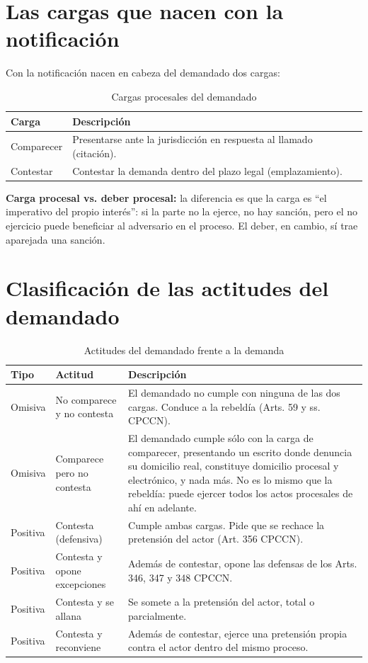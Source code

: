 \documentclass[12pt,oneside]{book}
\begin{document}
\section{Las cargas que nacen con la notificación}

Con la notificación nacen en cabeza del demandado dos cargas:

\begin{table}[H]
\centering
\caption{Cargas procesales del demandado}
\begin{tabularx}{\textwidth}{l X}
\toprule
\textbf{Carga} & \textbf{Descripción} \\
\midrule
Comparecer & Presentarse ante la jurisdicción en respuesta al llamado (citación). \\
Contestar & Contestar la demanda dentro del plazo legal (emplazamiento). \\
\bottomrule
\end{tabularx}
\end{table}

\begin{important}
\textbf{Carga procesal vs. deber procesal:} la diferencia es que la carga es ``el imperativo del propio interés'': si la parte no la ejerce, no hay sanción, pero el no ejercicio puede beneficiar al adversario en el proceso. El deber, en cambio, sí trae aparejada una sanción.
\end{important}

\section{Clasificación de las actitudes del demandado}

\begin{table}[H]
\centering
\caption{Actitudes del demandado frente a la demanda}
\begin{tabularx}{\textwidth}{l l X}
\toprule
\textbf{Tipo} & \textbf{Actitud} & \textbf{Descripción} \\
\midrule
Omisiva & No comparece y no contesta & El demandado no cumple con ninguna de las dos cargas. Conduce a la rebeldía (Arts. 59 y ss. CPCCN). \\
Omisiva & Comparece pero no contesta & El demandado cumple sólo con la carga de comparecer, presentando un escrito donde denuncia su domicilio real, constituye domicilio procesal y electrónico, y nada más. No es lo mismo que la rebeldía: puede ejercer todos los actos procesales de ahí en adelante. \\
Positiva & Contesta (defensiva) & Cumple ambas cargas. Pide que se rechace la pretensión del actor (Art. 356 CPCCN). \\
Positiva & Contesta y opone excepciones & Además de contestar, opone las defensas de los Arts. 346, 347 y 348 CPCCN. \\
Positiva & Contesta y se allana & Se somete a la pretensión del actor, total o parcialmente. \\
Positiva & Contesta y reconviene & Además de contestar, ejerce una pretensión propia contra el actor dentro del mismo proceso. \\
\bottomrule
\end{tabularx}
\end{table}
\end{document}
